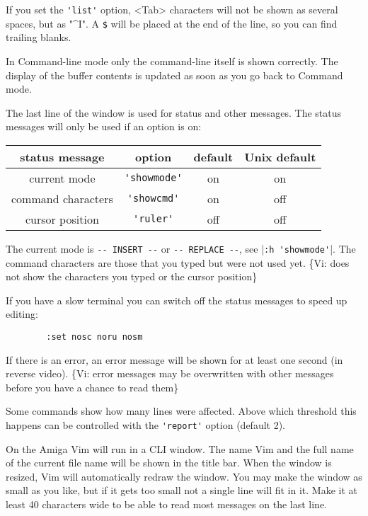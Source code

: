 If you set the \verb!'list'! option, <Tab> characters will not be shown as several spaces, but as "\textasciicircum I".
A \verb!$! will be placed at the end of the line, so you can find trailing blanks.

In Command-line mode only the command-line itself is shown correctly.
The display of the buffer contents is updated as soon as you go back to Command mode.

The last line of the window is used for status and other messages.
The status messages will only be used if an option is on:
\begin{center}
				\begin{tabular}{|c|c|c|c|}
								\hline
								status message     & option     & default & Unix default\\ \hline
								current mode       & \verb!'showmode'! & on      & on\\ \hline
								command characters & \verb!'showcmd'!  & on      & off\\ \hline
								cursor position    & \verb!'ruler'!    & off     & off\\ \hline
				\end{tabular}
\end{center}

The current mode is \verb"-- INSERT --" or \verb"-- REPLACE --", see |\verb!:h 'showmode'!|.
The command characters are those that you typed but were not used yet.
\{Vi: does not show the characters you typed or the cursor position\}

If you have a slow terminal you can switch off the status messages to speed up editing:
		\begin{verbatim}
		:set nosc noru nosm
		\end{verbatim}

If there is an error, an error message will be shown for at least one second (in reverse video).
\{Vi: error messages may be overwritten with other messages before you have a chance to read them\}

Some commands show how many lines were affected.
Above which threshold this happens can be controlled with the \verb!'report'! option (default 2).

On the Amiga Vim will run in a CLI window.
The name Vim and the full name of the current file name will be shown in the title bar.
When the window is resized, Vim will automatically redraw the window.
You may make the window as small as you like, but if it gets too small not a single line will fit in it.
Make it at least 40 characters wide to be able to read most messages on the last line.

